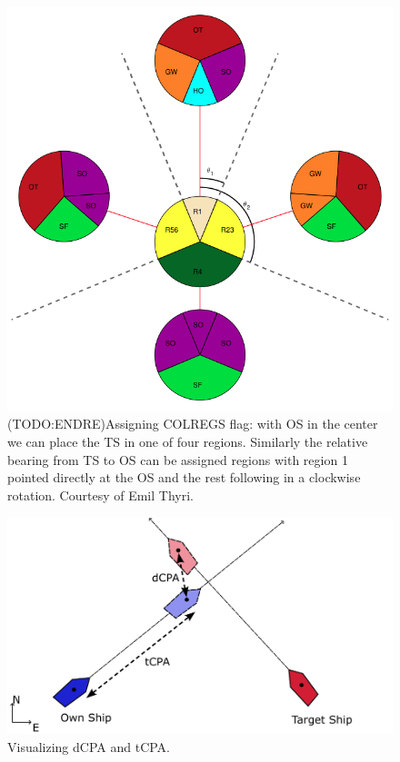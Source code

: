 \begin{figure}
    \centering
    \label{FIG: COLREGs Classification}
    \includegraphics[height=0.35\textheight]{Images/COLREGs_assess.png}
    \caption{(TODO:ENDRE)Assigning COLREGS flag: with OS in the center we can place the TS in one of four regions. Similarly the relative bearing from TS to OS can be assigned regions with region 1 pointed directly at the OS and the rest following in a clockwise rotation.
    Courtesy of Emil Thyri.}
\end{figure}

\begin{figure}
    \centering
    \label{FIG: ship CPA}
    \includegraphics[width=\textwidth]{Images/shipCPA.pdf}
    \caption{Visualizing dCPA and tCPA.}
\end{figure}

